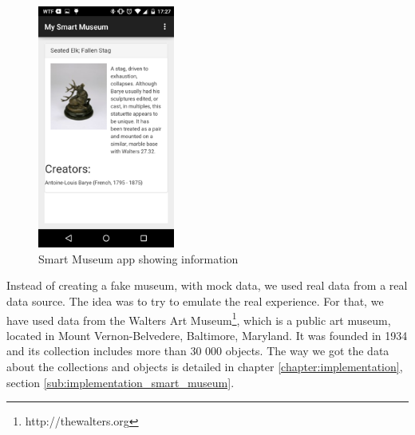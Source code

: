 \begin{figure}[!ht]
  \centering
    \includegraphics[width=0.4\textwidth, keepaspectratio]{images/screenshots/smart_museum_app}
    \caption{Smart Museum app showing information}
    \label{fig:smart_museum_app}
\end{figure}

Instead of creating a fake museum, with mock data, we used real data from a real data source.
The idea was to try to emulate the real experience.
For that, we have used data from the Walters Art Museum\footnote{http://thewalters.org}, which is a public art museum, located in Mount Vernon-Belvedere, Baltimore, Maryland.
It was founded in 1934 and its collection includes more than 30 000 objects.
The way we got the data about the collections and objects is detailed in chapter \ref{chapter:implementation}, section \ref{sub:implementation_smart_museum}.
